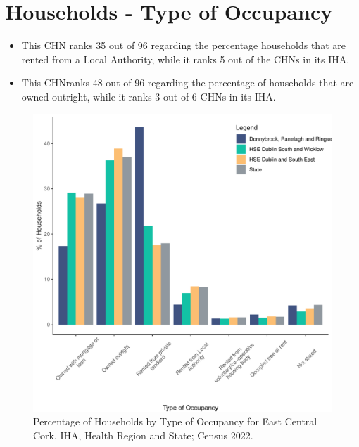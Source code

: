 \documentclass{article}
\begin{document}
\section{Households - Type of Occupancy}\label{sect:Households}
\begin{itemize}
\item This CHN ranks  35 out of 96 regarding the percentage households that are rented from a Local Authority, while it ranks  5 out of the CHNs in its IHA. 
\item This CHNranks  48 out of 96 regarding the percentage of households that are owned outright, while it ranks   3 out of 6 CHNs in its IHA.
\end{itemize}
\begin{figure}[H]
	\centering
	\includegraphics[width = 140mm]{../figures/HouseholdsED.pdf}
	\caption{Percentage of Households by Type of Occupancy for East Central Cork, IHA, Health Region and State; Census 2022.}
	\label{fig:vbnv}
	\end{figure}
\end{document}
